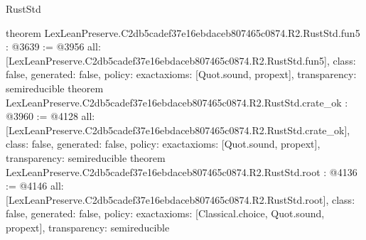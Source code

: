\begin{lexlean}{RustStd}
\begin{coremodule}
{}
theorem LexLeanPreserve.C2db5cadef37e16ebdaceb807465c0874.R2.RustStd.fun5 : @3639 := @3956 {
  all: [LexLeanPreserve.C2db5cadef37e16ebdaceb807465c0874.R2.RustStd.fun5],
  class: false,
  generated: false,
  policy: exact{axioms: [Quot.sound, propext]},
  transparency: semireducible
}
theorem LexLeanPreserve.C2db5cadef37e16ebdaceb807465c0874.R2.RustStd.crate_ok : @3960 := @4128 {
  all: [LexLeanPreserve.C2db5cadef37e16ebdaceb807465c0874.R2.RustStd.crate_ok],
  class: false,
  generated: false,
  policy: exact{axioms: [Quot.sound, propext]},
  transparency: semireducible
}
theorem LexLeanPreserve.C2db5cadef37e16ebdaceb807465c0874.R2.RustStd.root : @4136 := @4146 {
  all: [LexLeanPreserve.C2db5cadef37e16ebdaceb807465c0874.R2.RustStd.root],
  class: false,
  generated: false,
  policy: exact{axioms: [Classical.choice, Quot.sound, propext]},
  transparency: semireducible
}


\end{coremodule}
\end{lexlean}
